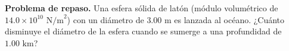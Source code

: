 \item \textbf{Problema de repaso.} Una esfera sólida de latón (módulo volumétrico de $14.0 \times 10^{10} \text{ N/m}^2$) con un diámetro de $3.00 \text{ m}$ es lanzada al océano. ¿Cuánto disminuye el diámetro de la esfera cuando se sumerge a una profundidad de $1.00 \text{ km}$?
